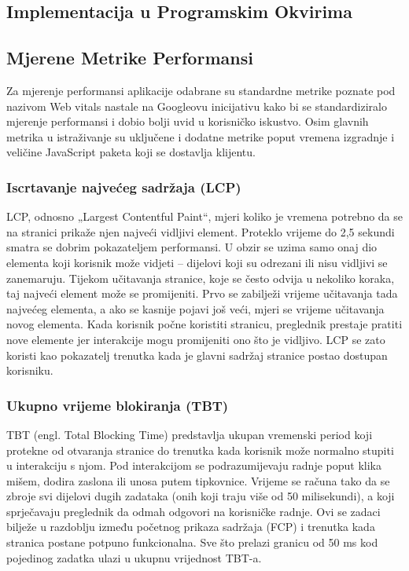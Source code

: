 \subsection{Implementacija u Programskim Okvirima}

\subsection{Mjerene Metrike Performansi}

Za mjerenje performansi aplikacije odabrane su standardne metrike poznate pod nazivom Web vitals nastale na Googleovu inicijativu kako bi se standardiziralo mjerenje performansi i dobio bolji uvid u korisničko iskustvo. Osim glavnih metrika u istraživanje su uključene i dodatne metrike poput vremena izgradnje i veličine JavaScript paketa koji se dostavlja klijentu.

\subsubsection{Iscrtavanje najvećeg sadržaja (LCP)}

LCP, odnosno „Largest Contentful Paint“, mjeri koliko je vremena potrebno da se na stranici prikaže njen najveći vidljivi element. Proteklo vrijeme do 2,5 sekundi smatra se dobrim pokazateljem performansi. U obzir se uzima samo onaj dio elementa koji korisnik može vidjeti – dijelovi koji su odrezani ili nisu vidljivi se zanemaruju. Tijekom učitavanja stranice, koje se često odvija u nekoliko koraka, taj najveći element može se promijeniti. Prvo se zabilježi vrijeme učitavanja tada najvećeg elementa, a ako se kasnije pojavi još veći, mjeri se vrijeme učitavanja novog elementa. Kada korisnik počne koristiti stranicu, preglednik prestaje pratiti nove elemente jer interakcije mogu promijeniti ono što je vidljivo. LCP se zato koristi kao pokazatelj trenutka kada je glavni sadržaj stranice postao dostupan korisniku. \cite{nordstrom2023comparison}

\subsubsection{Ukupno vrijeme blokiranja (TBT)}

TBT (engl. Total Blocking Time) predstavlja ukupan vremenski period koji protekne od otvaranja stranice do trenutka kada korisnik može normalno stupiti u interakciju s njom. Pod interakcijom se podrazumijevaju radnje poput klika mišem, dodira zaslona ili unosa putem tipkovnice. Vrijeme se računa tako da se zbroje svi dijelovi dugih zadataka (onih koji traju više od 50 milisekundi), a koji sprječavaju preglednik da odmah odgovori na korisničke radnje. Ovi se zadaci bilježe u razdoblju između početnog prikaza sadržaja (FCP) i trenutka kada stranica postane potpuno funkcionalna. Sve što prelazi granicu od 50 ms kod pojedinog zadatka ulazi u ukupnu vrijednost TBT-a. \cite{nordstrom2023comparison}

